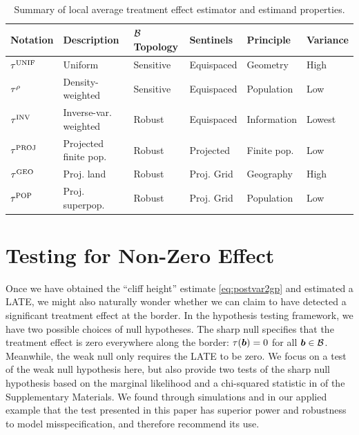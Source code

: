 \begin{table}[tbp]
    \centering
    \bgroup
    \def\arraystretch{1.1}%
    \begin{tabular}{llllll}
        \hline
        Notation   & Description           & \(\mathcal{B}\) Topology & Sentinels & Principle & Variance \\
        \hline
        \(\tau^{\mathrm{UNIF}}\) & Uniform               & Sensitive & Equispaced      & Geometry    & High     \\
        \(\tau^{\rho}\)  & Density-weighted      & Sensitive & Equispaced      & Population  & Low      \\
        \(\tau^{\mathrm{INV}}\)  & Inverse-var. weighted & Robust    & Equispaced      & Information & Lowest   \\
        \(\tau^{\mathrm{PROJ}}\) & Projected finite pop. & Robust    & Projected       & Finite pop. & Low      \\
        \(\tau^{\mathrm{GEO}}\)  & Proj. land            & Robust    & Proj. Grid  & Geography   & High     \\
        \(\tau^{\mathrm{POP}}\)  & Proj. superpop.       & Robust    & Proj. Grid  & Population  & Low \\
        \hline
    \end{tabular}
    \egroup
    \caption{
    \label{table:estimator_properties}
    Summary of local average treatment effect estimator and estimand properties.}
\end{table}

\section{Testing for Non-Zero Effect}
\label{sec:hypothesis_testing}
Once we have obtained the ``cliff height'' estimate \autoref{eq:postvar2gp} and estimated a LATE, we might also naturally wonder whether we can claim to have detected a significant treatment effect at the border.
In the hypothesis testing framework, we have two possible choices of null hypotheses.
The sharp null specifies that the treatment effect is zero everywhere along the border:
\(\tau(\bm{b})=0\) for all \(\bm{b} \in \mathcal{B}\).
Meanwhile, the weak null only requires the LATE to be zero.
We focus on a test of the weak null hypothesis here, but also provide two tests of the sharp null hypothesis based on the marginal likelihood and a chi-squared statistic in  of the Supplementary Materials.
We found through simulations and in our applied example that the test presented in this paper has superior power and robustness to model misspecification, and therefore recommend its use.

